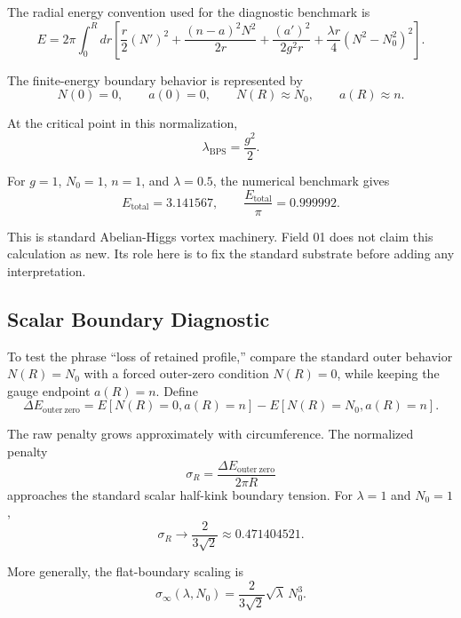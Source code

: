 \documentclass[11pt,a4paper]{article}
\begin{document}
The radial energy convention used for the diagnostic benchmark is
\begin{equation}
E
=2\pi\int_0^R dr\left[
\frac{r}{2}(N')^2
+\frac{(n-a)^2N^2}{2r}
+\frac{(a')^2}{2g^2r}
+\frac{\lambda r}{4}(N^2-N_0^2)^2
\right].
\end{equation}

The finite-energy boundary behavior is represented by
\begin{equation}
N(0)=0,
\qquad
a(0)=0,
\qquad
N(R)\approx N_0,
\qquad
a(R)\approx n.
\end{equation}

At the critical point in this normalization,
\begin{equation}
\lambda_{\mathrm{BPS}}=\frac{g^2}{2}.
\end{equation}

For $g=1$, $N_0=1$, $n=1$, and $\lambda=0.5$, the numerical benchmark gives
\begin{equation}
E_{\mathrm{total}}=3.141567,
\qquad
\frac{E_{\mathrm{total}}}{\pi}=0.999992.
\end{equation}

This is standard Abelian-Higgs vortex machinery. Field 01 does not claim this calculation as new. Its role here is to fix the standard substrate before adding any interpretation.

\subsection{Scalar Boundary Diagnostic}

To test the phrase ``loss of retained profile,'' compare the standard outer behavior $N(R)=N_0$ with a forced outer-zero condition $N(R)=0$, while keeping the gauge endpoint $a(R)=n$. Define
\begin{equation}
\Delta E_{\mathrm{outer\ zero}}
=E[N(R)=0,a(R)=n]-E[N(R)=N_0,a(R)=n].
\end{equation}

The raw penalty grows approximately with circumference. The normalized penalty
\begin{equation}
\sigma_R=\frac{\Delta E_{\mathrm{outer\ zero}}}{2\pi R}
\end{equation}
approaches the standard scalar half-kink boundary tension. For $\lambda=1$ and $N_0=1$,
\begin{equation}
\sigma_R\to \frac{2}{3\sqrt{2}}\approx0.471404521.
\end{equation}

More generally, the flat-boundary scaling is
\begin{equation}
\sigma_\infty(\lambda,N_0)
=\frac{2}{3\sqrt{2}}\sqrt{\lambda}\,N_0^3.
\end{equation}
\end{document}
